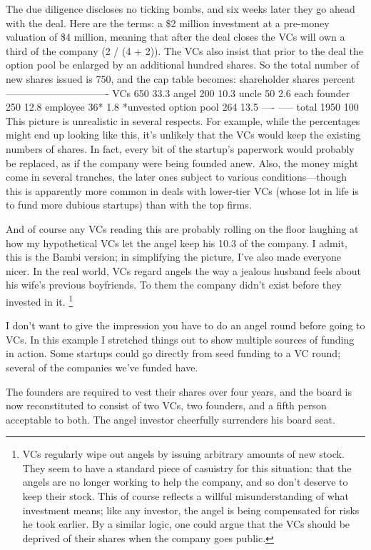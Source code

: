 \documentclass[12pt]{book}
\begin{document}
The due diligence discloses no ticking bombs, and six weeks later they
go ahead with the deal. Here are the terms: a \$2 million investment at
a pre-money valuation of \$4 million, meaning that after the deal closes
the VCs will own a third of the company (2 / (4 + 2)). The VCs also
insist that prior to the deal the option pool be enlarged by an
additional hundred shares. So the total number of new shares issued is
750, and the cap table becomes: shareholder shares percent
------------------------------- VCs 650 33.3 angel 200 10.3 uncle 50 2.6
each founder 250 12.8 employee 36* 1.8 *unvested option pool 264 13.5
---- ----- total 1950 100 This picture is unrealistic in several
respects. For example, while the percentages might end up looking like
this, it's unlikely that the VCs would keep the existing numbers of
shares. In fact, every bit of the startup's paperwork would probably be
replaced, as if the company were being founded anew. Also, the money
might come in several tranches, the later ones subject to various
conditions---though this is apparently more common in deals with
lower-tier VCs (whose lot in life is to fund more dubious startups) than
with the top firms.

And of course any VCs reading this are probably rolling on the floor
laughing at how my hypothetical VCs let the angel keep his 10.3 of the
company. I admit, this is the Bambi version; in simplifying the picture,
I've also made everyone nicer. In the real world, VCs regard angels the
way a jealous husband feels about his wife's previous boyfriends. To
them the company didn't exist before they invested in it.
\footnote{VCs regularly wipe out angels by issuing arbitrary amounts of
new stock. They seem to have a standard piece of casuistry for this
situation: that the angels are no longer working to help the company,
and so don't deserve to keep their stock. This of course reflects a
willful misunderstanding of what investment means; like any investor,
the angel is being compensated for risks he took earlier. By a similar
logic, one could argue that the VCs should be deprived of their shares
when the company goes public.}

I don't want to give the impression you have to do an angel round before
going to VCs. In this example I stretched things out to show multiple
sources of funding in action. Some startups could go directly from seed
funding to a VC round; several of the companies we've funded have.

The founders are required to vest their shares over four years, and the
board is now reconstituted to consist of two VCs, two founders, and a
fifth person acceptable to both. The angel investor cheerfully
surrenders his board seat.
\end{document}
